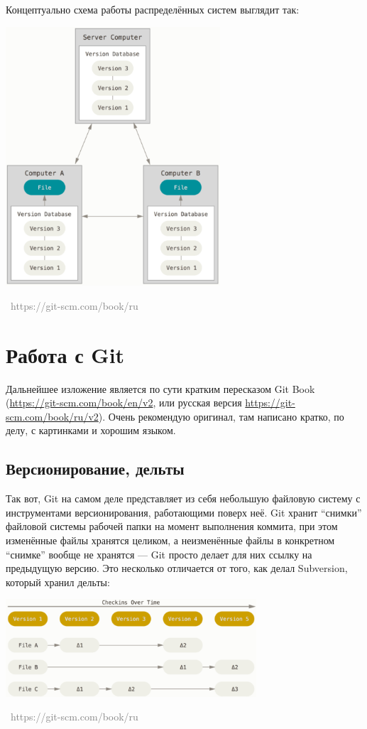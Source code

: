 \documentclass[a5paper]{article}
\newcommand{\attribution}[1] {
\vspace{-5mm}\begin{flushright}\begin{scriptsize}\textcolor{gray}{\textcopyright\, #1}\end{scriptsize}\end{flushright}
}
\begin{document}
Концептуально схема работы распределённых систем выглядит так:

\begin{center}
	\includegraphics[width=0.6\textwidth]{distributedVcs.png}
	\attribution{https://git-scm.com/book/ru}
\end{center}

\section{Работа с Git}

Дальнейшее изложение является по сути кратким пересказом Git Book (\url{https://git-scm.com/book/en/v2}, или русская версия \url{https://git-scm.com/book/ru/v2}). Очень рекомендую оригинал, там написано кратко, по делу, с картинками и хорошим языком.

\subsection{Версионирование, дельты}

Так вот, Git на самом деле представляет из себя небольшую файловую систему с инструментами версионирования, работающими поверх неё. Git хранит ``снимки'' файловой системы рабочей папки на момент выполнения коммита, при этом изменённые файлы хранятся целиком, а неизменённые файлы в конкретном ``снимке'' вообще не хранятся --- Git просто делает для них ссылку на предыдущую версию. Это несколько отличается от того, как делал Subversion, который хранил дельты:

\begin{center}
	\includegraphics[width=0.7\textwidth]{deltaVersioning.png}
	\attribution{https://git-scm.com/book/ru}
\end{center}
\end{document}

